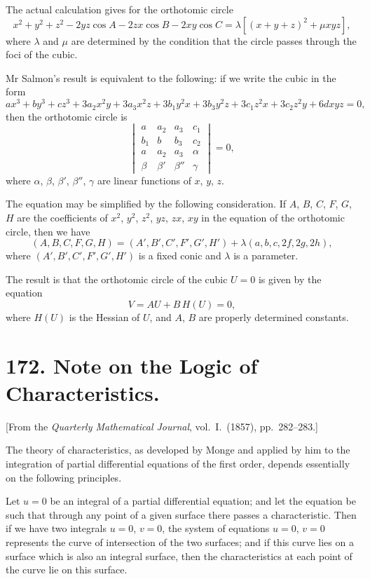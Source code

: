\documentclass[11pt,a4paper]{article}
\theoremstyle{plain}
\begin{document}
The actual calculation gives for the orthotomic circle
\[
x^2+y^2+z^2-2yz\cos A-2zx\cos B-2xy\cos C
= \lambda\left[(x+y+z)^2 + \mu xyz\right],
\]
where $\lambda$ and $\mu$ are determined by the condition that the circle passes through the foci of the cubic.

Mr Salmon's result is equivalent to the following: if we write the cubic in the form
\[
ax^3+by^3+cz^3+3a_2x^2y+3a_3x^2z+3b_1y^2x+3b_3y^2z+3c_1z^2x+3c_2z^2y+6dxyz = 0,
\]
then the orthotomic circle is
\[
\begin{vmatrix}
a & a_2 & a_3 & c_1 \\
b_1 & b & b_3 & c_2 \\
a & a_2 & a_3 & \alpha \\
\beta & \beta' & \beta'' & \gamma
\end{vmatrix} = 0,
\]
where $\alpha$, $\beta$, $\beta'$, $\beta''$, $\gamma$ are linear functions of $x$, $y$, $z$.

The equation may be simplified by the following consideration. If $A$, $B$, $C$, $F$, $G$, $H$ are the coefficients of $x^2$, $y^2$, $z^2$, $yz$, $zx$, $xy$ in the equation of the orthotomic circle, then we have
\[
(A,B,C,F,G,H) = (A',B',C',F',G',H') + \lambda(a,b,c,2f,2g,2h),
\]
where $(A',B',C',F',G',H')$ is a fixed conic and $\lambda$ is a parameter.

The result is that the orthotomic circle of the cubic $U=0$ is given by the equation
\[
V = AU + B\, H(U) = 0,
\]
where $H(U)$ is the Hessian of $U$, and $A$, $B$ are properly determined constants.


\newpage
\section*{172. Note on the Logic of Characteristics.}

[From the \textit{Quarterly Mathematical Journal}, vol.~I.~(1857), pp.~282--283.]

The theory of characteristics, as developed by Monge and applied by him to the integration of partial differential equations of the first order, depends essentially on the following principles.

Let $u=0$ be an integral of a partial differential equation; and let the equation be such that through any point of a given surface there passes a characteristic. Then if we have two integrals $u=0$, $v=0$, the system of equations $u=0$, $v=0$ represents the curve of intersection of the two surfaces; and if this curve lies on a surface which is also an integral surface, then the characteristics at each point of the curve lie on this surface.
\end{document}
